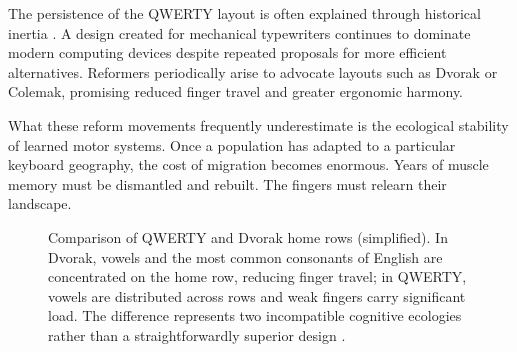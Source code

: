 \documentclass[11pt]{article}
\theoremstyle{definition}
\begin{document}
The persistence of the QWERTY layout is often explained through
historical inertia \cite{yamada1980}. A design created for mechanical
typewriters continues to dominate modern computing devices despite
repeated proposals for more efficient alternatives. Reformers
periodically arise to advocate layouts such as Dvorak or Colemak,
promising reduced finger travel and greater ergonomic harmony.

What these reform movements frequently underestimate is the ecological
stability of learned motor systems. Once a population has adapted to a
particular keyboard geography, the cost of migration becomes enormous.
Years of muscle memory must be dismantled and rebuilt. The fingers must
relearn their landscape.

\begin{figure}[h]
\centering
{}
\caption{Comparison of QWERTY and Dvorak home rows (simplified).
In Dvorak, vowels and the most common consonants of English are
concentrated on the home row, reducing finger travel; in QWERTY,
vowels are distributed across rows and weak fingers carry significant
load. The difference represents two incompatible cognitive ecologies
rather than a straightforwardly superior design \cite{yamada1980}.}
\label{fig:keyboard_compare}
\end{figure}
\end{document}
